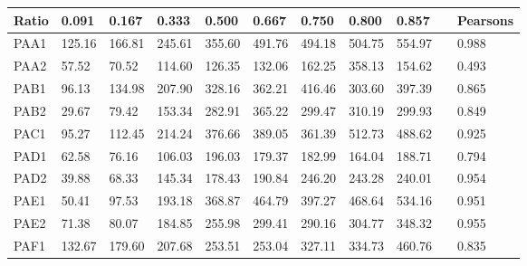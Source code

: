 \begin{tabular}{|l|l|l|l|l|l|l|l|l|l|l|}
\hline
\textbf{Ratio} & \textbf{0.091} & \textbf{0.167} & \textbf{0.333} & \textbf{0.500} & \textbf{0.667} & \textbf{0.750} & \textbf{0.800} & \textbf{0.857} &                  & \textbf{Pearsons} \\ \hline
PAA1           & 125.16         & 166.81         & 245.61         & 355.60         & 491.76         & 494.18         & 504.75         & 554.97         &                  & 0.988             \\ \hline
PAA2           & 57.52          & 70.52          & 114.60         & 126.35         & 132.06         & 162.25         & 358.13         & 154.62         &                  & 0.493             \\ \hline
PAB1           & 96.13          & 134.98         & 207.90         & 328.16         & 362.21         & 416.46         & 303.60         & 397.39         &                  & 0.865             \\ \hline
PAB2           & 29.67          & 79.42          & 153.34         & 282.91         & 365.22         & 299.47         & 310.19         & 299.93         &                  & 0.849             \\ \hline
PAC1           & 95.27          & 112.45         & 214.24         & 376.66         & 389.05         & 361.39         & 512.73         & 488.62         &                  & 0.925             \\ \hline
PAD1           & 62.58          & 76.16          & 106.03         & 196.03         & 179.37         & 182.99         & 164.04         & 188.71         &                  & 0.794             \\ \hline
PAD2           & 39.88          & 68.33          & 145.34         & 178.43         & 190.84         & 246.20         & 243.28         & 240.01         &                  & 0.954             \\ \hline
PAE1           & 50.41          & 97.53          & 193.18         & 368.87         & 464.79         & 397.27         & 468.64         & 534.16         &                  & 0.951             \\ \hline
PAE2           & 71.38          & 80.07          & 184.85         & 255.98         & 299.41         & 290.16         & 304.77         & 348.32         &                  & 0.955             \\ \hline
PAF1           & 132.67         & 179.60         & 207.68         & 253.51         & 253.04         & 327.11         & 334.73         & 460.76         &                  & 0.835             \\ \hline

\end{tabular}
